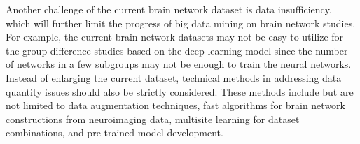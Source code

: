 Another challenge of the current brain network
dataset is data insufficiency, which will further 
limit the progress of big data mining on brain network studies. 
For example, the current brain network datasets may not be easy 
to utilize for the group difference studies based on the deep 
learning model since the number of networks in a few subgroups 
may not be enough to train the neural networks.
Instead of enlarging the current dataset, technical methods 
in addressing data quantity issues should also be strictly 
considered. These methods include but are not limited to 
data augmentation techniques, fast algorithms for brain 
network constructions from neuroimaging data, multisite 
learning for dataset combinations, and pre-trained model
development. \cite{Tang2023}